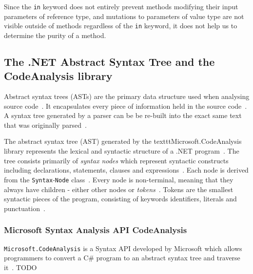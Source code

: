 \documentclass[a4paper,12pt]{article}
\begin{document}
Since the \texttt{in} keyword does not entirely prevent methods modifying their input parameters of reference type, and mutations to parameters of value type are not visible outside of methods regardless of the \texttt{in} keyword, it does not help us to determine the purity of a method.

\subsection{The .NET Abstract Syntax Tree and the CodeAnalysis library} \label{The .NET Abstract Syntax Tree and the CodeAnalysis library}

Abstract syntax trees (ASTs) are the primary data structure used when analysing source code~\cite{microsoft-work-with-syntax}. It encapsulates every piece of information held in the source code~\cite{microsoft-work-with-syntax}. A syntax tree generated by a parser can be be re-built into the exact same text that was originally parsed~\cite{microsoft-work-with-syntax}.

The abstract syntax tree (AST) generated by the texttt{Microsoft.CodeAnalysis} library represents the lexical and syntactic structure of a .NET program~\cite{microsoft-work-with-syntax}. The tree consists primarily of \textit{syntax nodes} which represent syntactic constructs including declarations, statements, clauses and expressions~\cite{microsoft-work-with-syntax}. Each node is derived from the \texttt{Syntax}-\texttt{Node} class~\cite{microsoft-work-with-syntax}. Every node is non-terminal, meaning that they always have children - either other nodes or \textit{tokens}~\cite{microsoft-work-with-syntax}. Tokens are the smallest syntactic pieces of the program, consisting of keywords identifiers, literals and punctuation~\cite{microsoft-work-with-syntax}.


\subsubsection{Microsoft Syntax Analysis API CodeAnalysis} \label{ssub:Microsoft Syntax Analysis API}
\texttt{Microsoft.CodeAnalysis} is a Syntax API developed by Microsoft which allows programmers to convert a C\# program to an abstract syntax tree and traverse it~\cite{microsoft-syntax-API}. TODO
\end{document}
